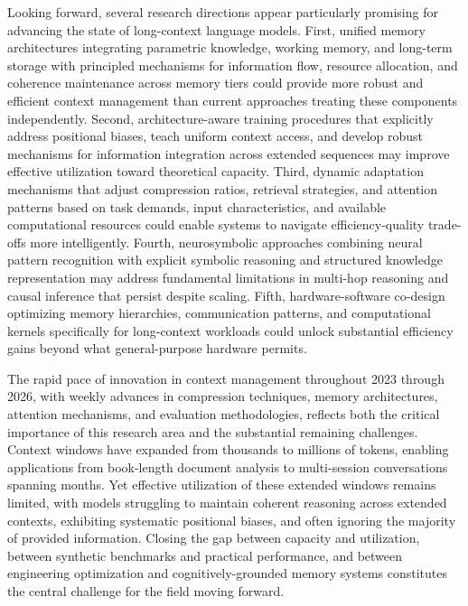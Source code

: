 \documentclass[11pt,letterpaper]{article}
\begin{document}
Looking forward, several research directions appear particularly promising for advancing the state of long-context language models. First, unified memory architectures integrating parametric knowledge, working memory, and long-term storage with principled mechanisms for information flow, resource allocation, and coherence maintenance across memory tiers could provide more robust and efficient context management than current approaches treating these components independently. Second, architecture-aware training procedures that explicitly address positional biases, teach uniform context access, and develop robust mechanisms for information integration across extended sequences may improve effective utilization toward theoretical capacity. Third, dynamic adaptation mechanisms that adjust compression ratios, retrieval strategies, and attention patterns based on task demands, input characteristics, and available computational resources could enable systems to navigate efficiency-quality trade-offs more intelligently. Fourth, neurosymbolic approaches combining neural pattern recognition with explicit symbolic reasoning and structured knowledge representation may address fundamental limitations in multi-hop reasoning and causal inference that persist despite scaling. Fifth, hardware-software co-design optimizing memory hierarchies, communication patterns, and computational kernels specifically for long-context workloads could unlock substantial efficiency gains beyond what general-purpose hardware permits.

The rapid pace of innovation in context management throughout 2023 through 2026, with weekly advances in compression techniques, memory architectures, attention mechanisms, and evaluation methodologies, reflects both the critical importance of this research area and the substantial remaining challenges. Context windows have expanded from thousands to millions of tokens, enabling applications from book-length document analysis to multi-session conversations spanning months. Yet effective utilization of these extended windows remains limited, with models struggling to maintain coherent reasoning across extended contexts, exhibiting systematic positional biases, and often ignoring the majority of provided information. Closing the gap between capacity and utilization, between synthetic benchmarks and practical performance, and between engineering optimization and cognitively-grounded memory systems constitutes the central challenge for the field moving forward.

\end{document}
